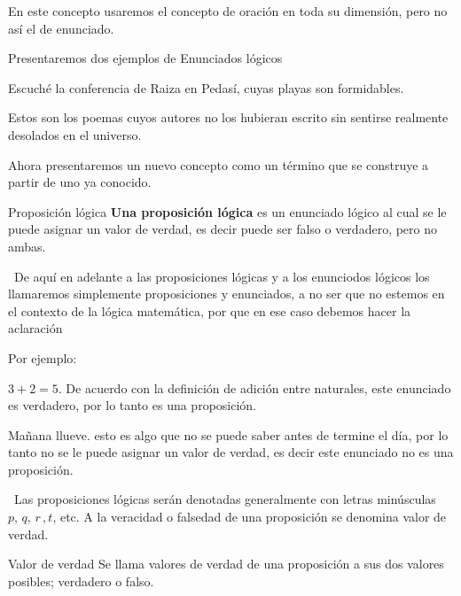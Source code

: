 En este concepto usaremos el concepto de oración en toda su dimensión,
pero no así el de enunciado.

Presentaremos dos ejemplos de Enunciados lógicos

\begin{lista}

\item Escuché la conferencia de Raiza en Pedasí, \textsf{cuyas playas
son formidables}.

\item Estos son los poemas \textsf{cuyos autores no los hubieran
escrito sin sentirse realmente desolados en el universo.}

\end{lista}

Ahora presentaremos un nuevo concepto como un término que se construye
a partir de uno ya conocido.

\begin{defi}{Proposición lógica}{}\textbf{ Una proposición lógica}
es un enunciado lógico al cual se le puede asignar un valor de verdad,
es decir puede ser falso o verdadero, pero no ambas.\end{defi}

\obs\ De aquí en adelante a las proposiciones lógicas y a los enunciodos
lógicos los llamaremos simplemente proposiciones y enunciados, a no
ser que no estemos en el contexto de la lógica matemática, por que
en ese caso debemos hacer la aclaración 

Por ejemplo: 

\begin{lista} 

\item $3+2=5$. De acuerdo con la definición de adición entre naturales,
este enunciado es verdadero, por lo tanto es una proposición. 

\item Mañana llueve. esto es algo que no se puede saber antes de
termine el día, por lo tanto no se le puede asignar un valor de verdad,
es decir este enunciado no es una proposición.

\end{lista} 

\notacion\ Las proposiciones lógicas serán denotadas generalmente
con letras minúsculas $p,\,q,\,r\,,t$, etc. A la veracidad o falsedad
de una proposición se denomina valor de verdad. 

\begin{defi}{ Valor de verdad }{} Se llama valores de verdad de
una proposición a sus dos valores posibles; verdadero o falso. \end{defi}

